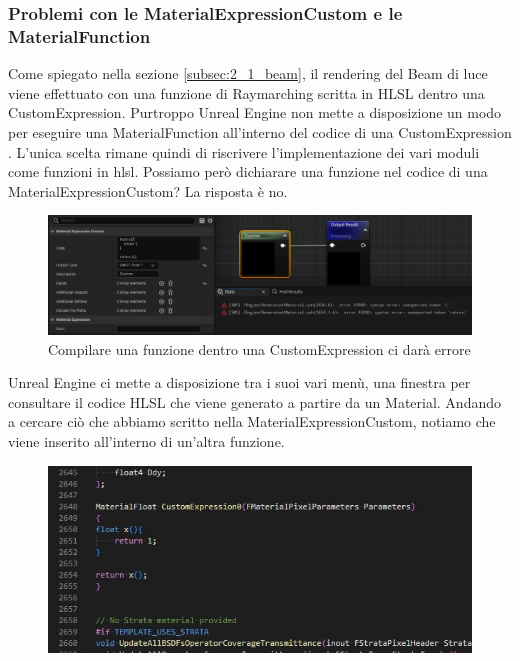 \documentclass[main.tex]{subfiles}
\begin{document}
\subsubsection{Problemi con le MaterialExpressionCustom e le MaterialFunction}\label{subsec:2_2_CM-MFproblems}
Come spiegato nella sezione \ref{subsec:2_1_beam}, il rendering del Beam di luce viene effettuato con una funzione di Raymarching scritta in HLSL dentro una CustomExpression. Purtroppo Unreal Engine non mette a disposizione un modo  per eseguire una MaterialFunction all'interno del codice di una CustomExpression \cite{customExpressionMaterialFunction}. L'unica scelta rimane quindi di riscrivere l'implementazione dei vari moduli come funzioni in hlsl. Possiamo però dichiarare una funzione nel codice di una MaterialExpressionCustom? La risposta è no.
\begin{figure}[H]
    \centering
    \includegraphics[width=1\linewidth]{img/renderingPipeline/meCustomNoFunc.jpg}
    \caption{Compilare una funzione dentro una CustomExpression ci darà errore}
    \label{fig:2_funcCompileError}
\end{figure}

Unreal Engine ci mette a disposizione tra i suoi vari menù, una finestra per consultare il codice HLSL che viene generato a partire da un Material. Andando a cercare ciò che abbiamo scritto nella MaterialExpressionCustom, notiamo che viene inserito all'interno di un'altra funzione.
\begin{figure}[H] %
    \centering
    \includegraphics[width=0.8\linewidth]{img/renderingPipeline/hlslFunInUn.jpg}
    \label{fig:2_funcInFunc}
\end{figure}
\end{document}
